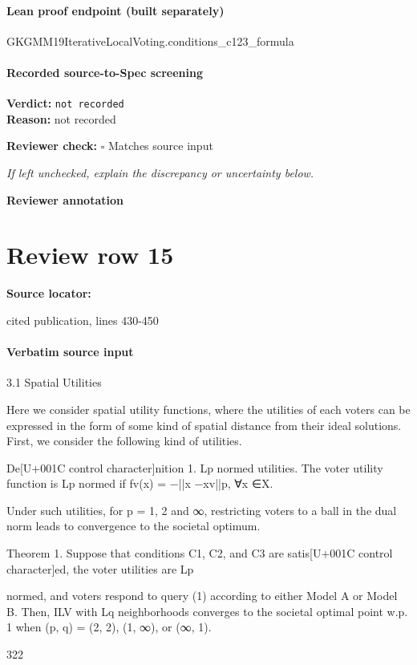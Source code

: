 \documentclass[10pt]{article}
\newcommand{\reviewerbox}{%
  \par\noindent\fbox{\parbox{0.96\linewidth}{\rule{0pt}{0.38in}}}\par
}
\newcommand{\reviewmatch}[1]{%
  \par\noindent\textbf{Reviewer check:} $\square$\; #1\par
  \noindent\emph{If left unchecked, explain the discrepancy or uncertainty below.}\par
}
\begin{document}
\paragraph{Lean proof endpoint (built separately)}\begin{ReviewVerbatim}
GKGMM19IterativeLocalVoting.conditions_c123_formula
\end{ReviewVerbatim}

\paragraph{Recorded source-to-Spec screening}
\textbf{Verdict:} \texttt{not recorded}
\\
\textbf{Reason:} not recorded
\reviewmatch{Matches source input}
\noindent\textbf{Reviewer annotation}\par
\reviewerbox
\clearpage
\hypertarget{source-claim-92f9aa83d7f7fe74}{}
\section*{Review row 15}
\textbf{Source locator:} {\footnotesize\raggedright cited publication, lines 430-\allowbreak{}450\par}
\paragraph{Verbatim source input}
\begin{ReviewVerbatim}
3.1 Spatial Utilities

Here we consider spatial utility functions, where the utilities of each voters can be expressed
in the form of some kind of spatial distance from their ideal solutions. First, we consider
the following kind of utilities.

De[U+001C control character]nition 1. Lp normed utilities. The voter utility function is Lp normed if fv(x) =
−||x −xv||p, ∀x ∈X.

Under such utilities, for p = 1, 2 and ∞, restricting voters to a ball in the dual norm
leads to convergence to the societal optimum.

Theorem 1. Suppose that conditions C1, C2, and C3 are satis[U+001C control character]ed, the voter utilities are Lp

normed, and voters respond to query (1) according to either Model A or Model B. Then,
ILV with Lq neighborhoods converges to the societal optimal point w.p. 1 when (p, q) = (2, 2),
(1, ∞), or (∞, 1).

322
\end{ReviewVerbatim}
\end{document}
